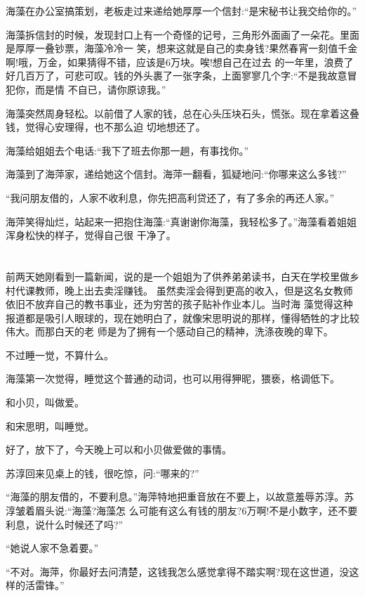 \documentclass[11pt,a4paper,onecolumn]{article}
\begin{document}
海藻在办公室搞策划，老板走过来递给她厚厚一个信封:``是宋秘书让我交给你的。''

海藻拆信封的时候，发现封口上有一个奇怪的记号，三角形外面画了一朵花。里面是厚厚一叠钞票，海藻冷冷一
笑，想来这就是自己的卖身钱?果然春宵一刻值千金啊!哦，万金，如果猜得不错，应该是6万块。唉!想自己在过去
的一年里，浪费了好几百万了，可悲可叹。钱的外头裹了一张字条，上面寥寥几个字:``不是我故意冒犯你，而是情
不自已，请你原谅我。''

海藻突然周身轻松。以前借了人家的钱，总在心头压块石头，慌张。现在拿着这叠钱，觉得心安理得，也不那么迫
切地想还了。

海藻给姐姐去个电话:``我下了班去你那一趟，有事找你。''

海藻到了海萍家，递给她这个信封。海萍一翻看，狐疑地问:``你哪来这么多钱?''

``我问朋友借的，人家不收利息，你先把高利贷还了，有了多余的再还人家。''

海萍笑得灿烂，站起来一把抱住海藻:``真谢谢你海藻，我轻松多了。''海藻看着姐姐浑身松快的样子，觉得自己很
干净了。

\section[\thesection]{}

前两天她刚看到一篇新闻，说的是一个姐姐为了供养弟弟读书，白天在学校里做乡村代课教师，晚上出去卖淫赚钱。
虽然卖淫会得到更高的收入，但是这名女教师依旧不放弃自己的教书事业，还为穷苦的孩子贴补作业本儿。当时海
藻觉得这种报道都是吸引人眼球的，现在她明白了，就像宋思明说的那样，懂得牺牲的才比较伟大。而那白天的老
师是为了拥有一个感动自己的精神，洗涤夜晚的卑下。

不过睡一觉，不算什么。

海藻第一次觉得，睡觉这个普通的动词，也可以用得狎昵，猥亵，格调低下。

和小贝，叫做爱。

和宋思明，叫睡觉。

好了，放下了，今天晚上可以和小贝做爱做的事情。

苏淳回来见桌上的钱，很吃惊，问:``哪来的?''

``海藻的朋友借的，不要利息。''海萍特地把重音放在不要上，以故意羞辱苏淳。苏淳皱着眉头说:``海藻?海藻怎
么可能有这么有钱的朋友?6万啊!不是小数字，还不要利息，说什么时候还了吗?''

``她说人家不急着要。''

``不对。海萍，你最好去问清楚，这钱我怎么感觉拿得不踏实啊?现在这世道，没这样的活雷锋。''
\end{document}

